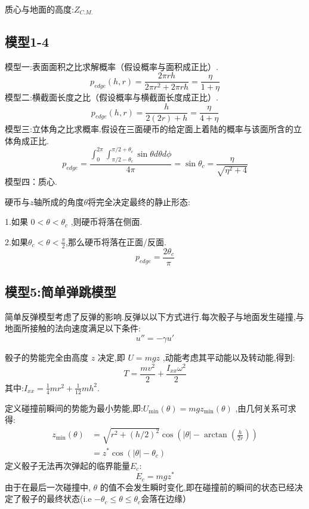 \documentclass[UTF8]{gapd}
\begin{document}
质心与地面的高度:\quad$Z_{C.M.}$

\subsection{模型1-4}
模型一:表面面积之比求解概率（假设概率与面积成正比）.
\begin{equation}
{p_{edge}}(h,r) = \frac{{2\pi rh}}{{2\pi {r^2} + 2\pi rh}} = \frac{\eta }{{1 + \eta }}
\end{equation}
模型二:横截面长度之比（假设概率与横截面长度成正比）.
\begin{equation}
{p_{edge}}(h,r) = \frac{h}{{2(2r) + h}} = \frac{\eta }{{4 + \eta }}
\end{equation}
模型三:立体角之比求概率.假设在三面硬币的给定面上着陆的概率与该面所含的立体角成正比.
\begin{equation}
p_{edge}=\frac{\int_0^{2\pi}{\int_{\pi /2-\theta _c}^{\pi /2+\theta _c}{\sin \theta d\theta d\phi}}}{4\pi}=\sin \theta _c=\frac{\eta}{\sqrt{\eta ^2+4}}
\end{equation}
模型四：质心.

硬币与$z$轴所成的角度$\theta$将完全决定最终的静止形态:

1.如果      $0<\theta<\theta_{c}$           ,则硬币将落在侧面.

2.如果$\theta_{c}<\theta<\frac{\pi}{2}$,那么硬币将落在正面/反面.
\begin{equation}
{p_{edge}} = \frac{2\theta _c}{\pi}
\end{equation}

\subsection{模型5:简单弹跳模型}
简单反弹模型考虑了反弹的影响.反弹以以下方式进行.每次骰子与地面发生碰撞,与地面所接触的法向速度满足以下条件:
\begin{equation}
u''=-\gamma u'
\end{equation}


骰子的势能完全由高度 $z$ 决定,即  $U=mgz$             ,动能考虑其平动能以及转动能,得到:
\begin{equation}
T=\frac{m v^{2}}{2}+\frac{I_{x x} \omega^{2}}{2}
\end{equation}
其中:$I_{xx}=\frac{1}{4}mr^2+\frac{1}{12}mh^2$.

定义碰撞前瞬间的势能为最小势能,即:$U_{\min}\left( \theta \right) =mgz_{\min}\left( \theta \right) $             ,由几何关系可求得:
\begin{equation}
\begin{aligned}
z_{\min }(\theta) &=\sqrt{r^{2}+(h / 2)^{2}} \cos \left(|\theta|-\arctan \left(\frac{h}{2 r}\right)\right) \\
&=z^{*} \cos \left(|\theta|-\theta_{c}\right)
\end{aligned}
\end{equation}
定义骰子无法再次弹起的临界能量$E_{c}$:
\begin{equation}
E_{c}=mgz^*
\end{equation}
由于在最后一次碰撞中, $\theta$   的值不会发生瞬时变化,即在碰撞前的瞬间的状态已经决定了骰子的最终状态(i.e $-\theta _c\leqslant \theta \leqslant \theta _c$会落在边缘）
\end{document}
